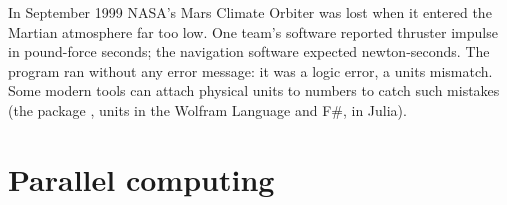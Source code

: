 \begin{history}
In September 1999 NASA's Mars Climate Orbiter was lost when it entered the Martian
atmosphere far too low. One team's software reported thruster impulse in pound-force
seconds; the navigation software expected newton-seconds. The program ran without any
error message: it was a logic error, a units mismatch. Some modern tools can attach
physical units to numbers to catch such mistakes (the \py package , units in
the Wolfram Language and F\#,  in Julia).
\end{history}

\section{Parallel computing}

